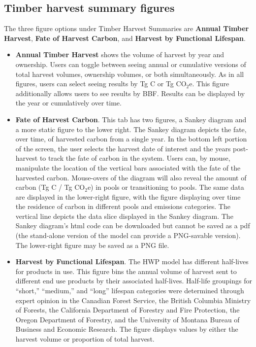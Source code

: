 \documentclass[
  openany]{book}
\begin{document}
\hypertarget{app-shiny-timber}{%
\subsection{Timber harvest summary figures}\label{app-shiny-timber}}

The three figure options under Timber Harvest Summaries are \textbf{Annual Timber Harvest}, \textbf{Fate of Harvest Carbon}, and \textbf{Harvest by Functional Lifespan}.

\begin{itemize}
\item
  \textbf{Annual Timber Harvest} shows the volume of harvest by year and ownership. Users can toggle between seeing annual or cumulative versions of total harvest volumes, ownership volumes, or both simultaneously. As in all figures, users can select seeing results by Tg C or Tg CO\(_2\)e. This figure additionally allows users to see results by BBF. Results can be displayed by the year or cumulatively over time.
\item
  \textbf{Fate of Harvest Carbon}. This tab has two figures, a Sankey diagram and a more static figure to the lower right. The Sankey diagram depicts the fate, over time, of harvested carbon from a single year. In the bottom left portion of the screen, the user selects the harvest date of interest and the years post-harvest to track the fate of carbon in the system. Users can, by mouse, manipulate the location of the vertical bars associated with the fate of the harvested carbon. Mouse-overs of the diagram will also reveal the amount of carbon (Tg C / Tg CO\(_2\)e) in pools or transitioning to pools. The same data are displayed in the lower-right figure, with the figure displaying over time the residence of carbon in different pools and emissions categories. The vertical line depicts the data slice displayed in the Sankey diagram. The Sankey diagram's html code can be downloaded but cannot be saved as a pdf (the stand-alone version of the model can provide a PNG-savable version). The lower-right figure may be saved as a PNG file.
\item
  \textbf{Harvest by Functional Lifespan}. The HWP model has different half-lives for products in use. This figure bins the annual volume of harvest sent to different end use products by their associated half-lives. Half-life groupings for ``short,'' ``medium,'' and ``long'' lifespan categories were determined through expert opinion in the Canadian Forest Service, the British Columbia Ministry of Forests, the California Department of Forestry and Fire Protection, the Oregon Department of Forestry, and the University of Montana Bureau of Business and Economic Research. The figure displays values by either the harvest volume or proportion of total harvest.
\end{itemize}
\end{document}

